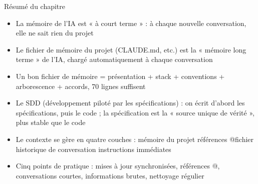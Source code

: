 \begin{tcbsummary}{Résumé du chapitre}
\begin{itemize}
  \item La mémoire de l'IA est « à court terme » : à chaque nouvelle conversation, elle ne sait rien du projet
  \item Le fichier de mémoire du projet (CLAUDE.md, etc.) est la « mémoire long terme » de l'IA, chargé automatiquement à chaque conversation
  \item Un bon fichier de mémoire = présentation + stack + conventions + arborescence + accords, 70 lignes suffisent
  \item Le SDD (développement piloté par les spécifications) : on écrit d'abord les spécifications, puis le code ; la spécification est la « source unique de vérité », plus stable que le code
  \item Le contexte se gère en quatre couches : mémoire du projet références @fichier historique de conversation instructions immédiates
  \item Cinq points de pratique : mises à jour synchronisées, références @, conversations courtes, informations brutes, nettoyage régulier
\end{itemize}

\end{tcbsummary}
